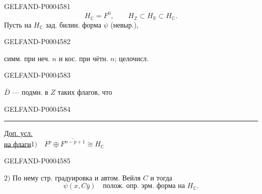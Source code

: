 \begin{GelfandAdjacentEvidence}{GELFAND-P000458}{1}
\[
H_{\mathbb C}=F^0,\qquad H_{\mathbb Z}\subset H_{\mathbb R}\subset H_{\mathbb C}.
\]
Пусть на $H_{\mathbb C}$ зад. билин. форма $\psi$ (невыр.),
\end{GelfandAdjacentEvidence}
\begin{GelfandAdjacentEvidence}{GELFAND-P000458}{2}

симм. при неч. $n$ и кос. при чётн. $n$; целочисл.
\end{GelfandAdjacentEvidence}
\begin{GelfandAdjacentEvidence}{GELFAND-P000458}{3}


$\overline D$ — подмн. в $Z$ таких флагов, что
\end{GelfandAdjacentEvidence}
\begin{GelfandAdjacentEvidence}{GELFAND-P000458}{4}


\noindent\rule{\linewidth}{.35pt}

\underline{Доп. усл.}\\
\underline{на флаги}\quad $1)\quad F^p\oplus\overline{F^{n-p+1}}\cong H_{\mathbb C}$
\end{GelfandAdjacentEvidence}
\begin{GelfandAdjacentEvidence}{GELFAND-P000458}{5}


$2)$ По нему стр. градуировка и автом. Вейля $C$ и тогда
\[
\psi(x,C\bar y)\quad\text{полож. опр. эрм. форма на $H_{\mathbb C}$.}
\]
\end{GelfandAdjacentEvidence}
